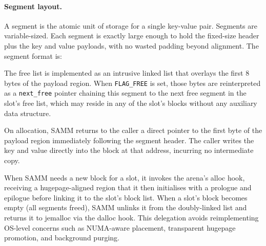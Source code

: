 \paragraph{Segment layout.}
A segment is the atomic unit of storage for a single key-value pair. Segments are variable-sized. Each segment is exactly large enough to hold the fixed-size header plus the key and value payloads, with no wasted padding beyond alignment. The segment format is:

The free list is implemented as an intrusive linked list that overlays the first 8 bytes of the payload region. When \texttt{FLAG\_FREE} is set, those bytes are reinterpreted as a \texttt{next\_free} pointer chaining this segment to the next free segment in the slot's free list, which may reside in any of the slot's blocks without any auxiliary data structure.

On allocation, SAMM returns to the caller a direct pointer to the first byte of the payload region immediately following the segment header. The caller writes the key and value directly into the block at that address, incurring no intermediate copy.

When SAMM needs a new block for a slot, it invokes the arena's alloc hook, receiving a hugepage-aligned region that it then initialises with a prologue and epilogue before linking it to the slot's block list. When a slot's block becomes empty (all segments freed), SAMM unlinks it from the doubly-linked list and returns it to jemalloc via the dalloc hook. This delegation avoids reimplementing OS-level concerns such as NUMA-aware placement, transparent hugepage promotion, and background purging.

